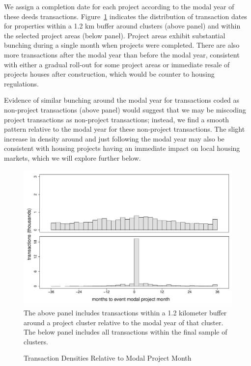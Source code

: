 \documentclass[12pt]{article}
\begin{document}
We assign a completion date for each project according to the modal year of these deeds transactions.  Figure~\ref{figure:densitytime} indicates the distribution of transaction dates for properties within a 1.2 km buffer around clusters (above panel) and within the selected project areas (below panel).  Project areas exhibit substantial bunching during a single month when projects were completed.  There are also more transactions after the modal year than before the modal year, consistent with either a gradual roll-out for some project areas or immediate resale of projects houses after construction, which would be counter to housing regulations.  


Evidence of similar bunching around the modal year for transactions coded as non-project transactions (above panel) would suggest that we may be miscoding project transactions as non-project transactions; instead, we find a smooth pattern relative to the modal year for these non-project transactions.  The slight increase in density around and just following the modal year may also be consistent with housing projects having an immediate impact on local housing markets, which we will explore further below.

\begin{figure}
\caption{Transaction Densities Relative to Modal Project Month}\label{figure:densitytime}
\centering
\includegraphics[scale=.5]{figures/summary_densitytime.pdf} \\
The above panel includes transactions within a 1.2 kilometer buffer around a project cluster relative to the modal year of that cluster.  The below panel includes all transactions within the final sample of clusters.
\end{figure}
\end{document}
